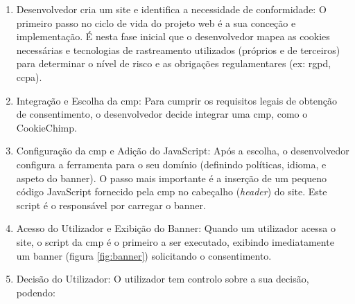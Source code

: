 \begin{enumerate}
    \item Desenvolvedor cria um site e identifica a necessidade de conformidade: O primeiro passo no ciclo de vida do projeto web é a sua conceção e implementação. É nesta fase inicial que o desenvolvedor mapea as cookies necessárias e tecnologias de rastreamento utilizados (próprios e de terceiros) para determinar o nível de risco e as obrigações regulamentares (ex: \acrshort{rgpd}, \acrfull{ccpa}).
    \item Integração e Escolha da \acrshort{cmp}: Para cumprir os requisitos legais de obtenção de consentimento, o desenvolvedor decide integrar uma \acrshort{cmp}, como o CookieChimp.
    \item Configuração da \acrshort{cmp} e Adição do JavaScript: Após a escolha, o desenvolvedor configura a ferramenta para o seu domínio (definindo políticas, idioma, e aspeto do banner). O passo mais importante é a inserção de um pequeno código JavaScript fornecido pela \acrshort{cmp} no cabeçalho (\textit{header}) do site. Este script é o responsável por carregar o banner.
    \item Acesso do Utilizador e Exibição do Banner: Quando um utilizador acessa o site, o script da \acrshort{cmp} é o primeiro a ser executado, exibindo imediatamente um banner (figura \ref{fig:banner}) solicitando o consentimento.
    \item Decisão do Utilizador: O utilizador tem controlo sobre a sua decisão, podendo:


\end{enumerate}

